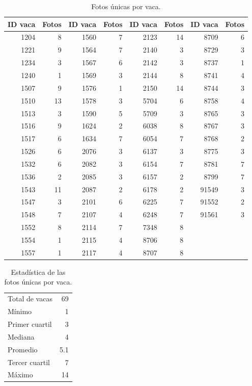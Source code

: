 \begin{table}[H]
  \centering
  \small
  \caption{Fotos únicas por vaca.}
  \label{tab:fotos-por-vaca}
  \begin{tabular}{rr@{\hspace{2em}}rr@{\hspace{2em}}rr@{\hspace{2em}}rr}
    \toprule
    ID vaca & Fotos & ID vaca & Fotos & ID vaca & Fotos & ID vaca & Fotos \\
    \midrule
    1204 & 8 & 1560 & 7 & 2123 & 14 & 8709 & 6 \\
    1221 & 9 & 1564 & 7 & 2140 & 3 & 8729 & 3 \\
    1234 & 3 & 1567 & 6 & 2142 & 3 & 8737 & 1 \\
    1240 & 1 & 1569 & 3 & 2144 & 8 & 8741 & 4 \\
    1507 & 9 & 1576 & 1 & 2150 & 14 & 8744 & 3 \\
    1510 & 13 & 1578 & 3 & 5704 & 6 & 8758 & 4 \\
    1513 & 3 & 1590 & 5 & 5709 & 3 & 8765 & 3 \\
    1516 & 9 & 1624 & 2 & 6038 & 8 & 8767 & 3 \\
    1517 & 6 & 1634 & 7 & 6054 & 7 & 8768 & 2 \\
    1526 & 6 & 2076 & 3 & 6137 & 3 & 8775 & 3 \\
    1532 & 6 & 2082 & 3 & 6154 & 7 & 8781 & 7 \\
    1536 & 2 & 2085 & 3 & 6157 & 2 & 8799 & 7 \\
    1543 & 11 & 2087 & 2 & 6178 & 2 & 91549 & 3 \\
    1547 & 3 & 2101 & 6 & 6225 & 7 & 91552 & 2 \\
    1548 & 7 & 2107 & 4 & 6248 & 7 & 91561 & 3 \\
    1552 & 8 & 2114 & 7 & 7348 & 8 &  &  \\
    1554 & 1 & 2115 & 4 & 8706 & 8 &  &  \\
    1557 & 1 & 2117 & 4 & 8707 & 8 &  &  \\
    \bottomrule
  \end{tabular}
\end{table}
\begin{table}[H]
  \centering
  \caption{Estadística de las fotos únicas por vaca.}
  \label{tab:fotos-stats}
  \begin{tabular}{lr}
    \toprule
    Total de vacas & 69 \\
    Mínimo & 1 \\
    Primer cuartil & 3 \\
    Mediana & 4 \\
    Promedio & 5.1 \\
    Tercer cuartil & 7 \\
    Máximo & 14 \\
    \bottomrule
  \end{tabular}
\end{table}

